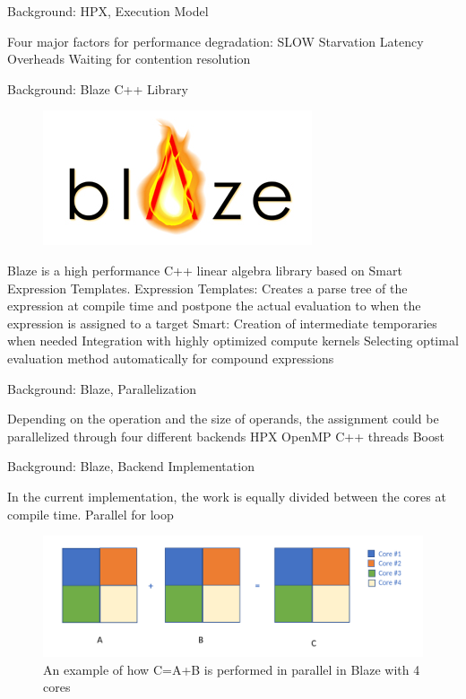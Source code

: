 \documentclass[10pt]{beamer}
\begin{document}
\begin{frame}{Background: HPX, Execution Model}
	\begin{outline}
		Four major factors for performance degradation: SLOW
		\1Starvation
		\1Latency
		\1Overheads
		\1Waiting for contention resolution
	\end{outline}
\end{frame}


\begin{frame}{Background: Blaze C++ Library}
\begin{outline}
\begin{figure}[H]

	\includegraphics[width=0.22\linewidth]{images/blaze.png}
\end{figure}	
Blaze is a high performance C++ linear algebra library based on Smart Expression Templates.
 \1Expression Templates:
	\2Creates a parse tree of the expression at compile time and postpone the actual evaluation to when the expression is assigned to a target
\1 Smart: 
	\2Creation of intermediate temporaries when needed
	\2Integration with highly optimized compute kernels
	\2Selecting optimal evaluation method automatically for compound expressions
\end{outline}
\end{frame}


\begin{frame}{Background: Blaze, Parallelization}
	\begin{outline}
		Depending on the operation and the size of operands, the assignment could be parallelized through four different backends
		\1 HPX 
		\1OpenMP
		\1C++ threads
		\1Boost
	\end{outline}
\end{frame}

\begin{frame}{Background: Blaze, Backend Implementation}
	\begin{outline}
		In the current implementation, the work is equally divided between the cores at compile time. 
		\1Parallel for loop
		\begin{figure}
			\centering
			\includegraphics[width=0.72\linewidth]{images/old_backend.png}
			\caption{An example of how C=A+B is performed in parallel in Blaze with 4 cores}	
		\end{figure}	

	\end{outline}
\end{frame}
\end{document}

